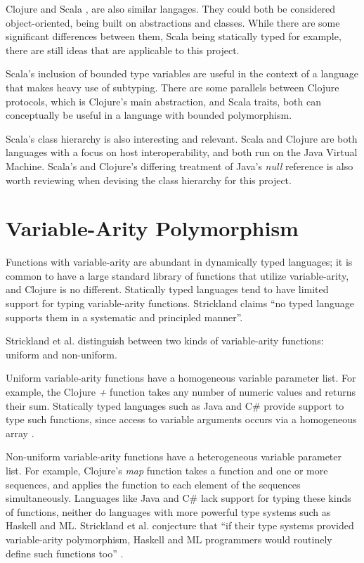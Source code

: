 \documentclass[12pt, a4paper]{article}
\begin{document}
Clojure and Scala \cite{Odersky06anoverview},
are also similar langages.  
They could both be considered object-oriented, being built on abstractions
and classes. While there are some significant differences between them,
Scala being statically typed for example, there are still ideas that are applicable to this project.

Scala's inclusion of bounded type variables are useful in the context
of a language that makes heavy use of subtyping. There are some parallels
between Clojure protocols, which is Clojure's main abstraction, and Scala
traits, both can conceptually be useful in a language with bounded polymorphism.

Scala's class hierarchy \cite{Odersky06anoverview}
is also interesting and relevant. Scala and Clojure are
both languages with a focus on host interoperability, and both run
on the Java Virtual Machine.  Scala's and Clojure's
differing treatment of Java's \emph{null} reference is
also worth reviewing when devising the class hierarchy for this project.

\section{Variable-Arity Polymorphism}

Functions with variable-arity are abundant in dynamically typed languages;
it is common to have a large standard library of functions that utilize
variable-arity, and Clojure is no different. 
Statically typed languages tend to have limited support
for typing variable-arity functions. Strickland claims 
\cite{Strickland:2009:PVP:1532974.1532978}
``no typed language supports them in a systematic and principled manner''.

Strickland et al.  \cite{Strickland:2009:PVP:1532974.1532978} distinguish between two kinds
of variable-arity functions: uniform and non-uniform.

Uniform variable-arity functions have a homogeneous variable parameter list.
For example, the Clojure \emph{+} function takes any number of numeric values
and returns their sum.
Statically typed languages such as Java and C\# provide support to type such functions,
since access to variable arguments occurs via a homogeneous array \cite{Strickland:2009:PVP:1532974.1532978}
.

Non-uniform variable-arity functions have a heterogeneous variable parameter list.
For example, Clojure's \emph{map} function takes a function and one or more sequences,
and applies the function to each element of the sequences simultaneously.
Languages like Java and C\# lack support for typing these kinds of functions,
neither do languages with more powerful type systems such as Haskell and ML.
Strickland et al. conjecture that ``if their type systems provided variable-arity
polymorphism, Haskell and ML programmers would routinely define such functions too''
\cite{Strickland:2009:PVP:1532974.1532978}
.
\end{document}
